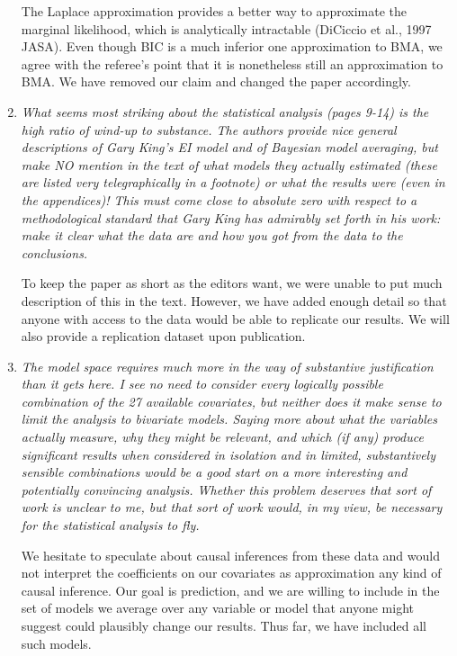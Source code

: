 \documentclass[11pt]{article}
\begin{document}
\begin{enumerate}
  The Laplace approximation provides a better way to approximate the
  marginal likelihood, which is analytically intractable (DiCiccio et
  al., 1997 JASA).  Even though BIC is a much inferior one
  approximation to BMA, we agree with the referee's point that it is
  nonetheless still an approximation to BMA.  We have removed our
  claim and changed the paper accordingly.
  
\item {\it What seems most striking about the statistical analysis (pages
  9-14) is the high ratio of wind-up to substance.  The authors
  provide nice general descriptions of Gary King's EI model and of
  Bayesian model averaging, but make NO mention in the text of what
  models they actually estimated (these are listed very
  telegraphically in a footnote) or what the results were (even in the
  appendices)!  This must come close to absolute zero with respect to
  a methodological standard that Gary King has admirably set forth in
  his work: make it clear what the data are and how you got from the
  data to the conclusions.}

To keep the paper as short as the editors want, we were unable to put
much description of this in the text.  However, we have added enough
detail so that anyone with access to the data would be able to
replicate our results.  We will also provide a replication dataset
upon publication.

\item {\it The model space requires much more in the way of
    substantive justification than it gets here.  I see no need to
    consider every logically possible combination of the 27 available
    covariates, but neither does it make sense to limit the analysis
    to bivariate models.  Saying more about what the variables
    actually measure, why they might be relevant, and which (if any)
    produce significant results when considered in isolation and in
    limited, substantively sensible combinations would be a good start
    on a more interesting and potentially convincing analysis.
    Whether this problem deserves that sort of work is unclear to me,
    but that sort of work would, in my view, be necessary for the
    statistical analysis to fly.}
 
  We hesitate to speculate about causal inferences from these data and
  would not interpret the coefficients on our covariates as
  approximation any kind of causal inference.  Our goal is prediction,
  and we are willing to include in the set of models we average over
  any variable or model that anyone might suggest could plausibly
  change our results.  Thus far, we have included all such models.
\end{enumerate}
\end{document}
